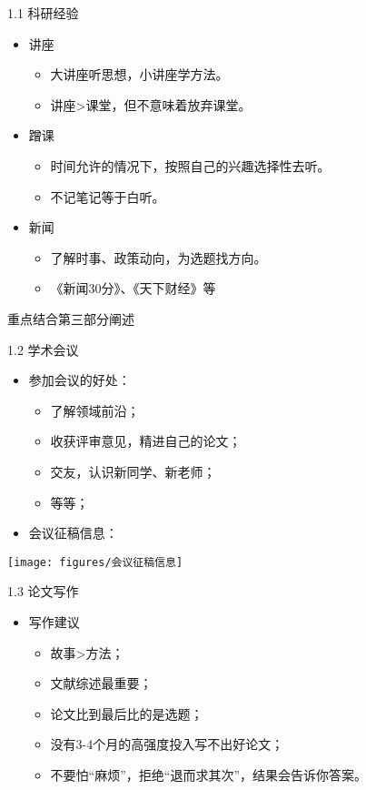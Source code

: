 \documentclass{beamer}%
\begin{document}
\begin{frame}[t]{1.1 科研经验}
\begin{itemize}
  \item 讲座
  \begin{itemize}
    \item 大讲座听思想，小讲座学方法。
    \item 讲座>课堂，但不意味着放弃课堂。
  \end{itemize}
  \item 蹭课
  \begin{itemize}
    \item 时间允许的情况下，按照自己的兴趣选择性去听。
    \item 不记笔记等于白听。
  \end{itemize}
  \item 新闻
  \begin{itemize}
    \item 了解时事、政策动向，为选题找方向。
    \item 《新闻30分》、《天下财经》等
  \end{itemize}
\end{itemize}
重点结合第三部分阐述
\end{frame}

\begin{frame}[t]{1.2 学术会议}
\begin{itemize}
  \item 参加会议的好处：
  \begin{itemize}
    \item 了解领域前沿；
    \item 收获评审意见，精进自己的论文；
    \item 交友，认识新同学、新老师；
    \item 等等；
  \end{itemize}
  \item 会议征稿信息：
\end{itemize}
\vspace{-0.2cm} %
\begin{center}
	\texttt{[image: figures/会议征稿信息]}
\end{center}
\end{frame}

\begin{frame}[t]{1.3 论文写作}
\begin{itemize}
  \item 写作建议
  \begin{itemize}
    \item 故事>方法；
    \item 文献综述最重要；
    \item 论文比到最后比的是选题；
    \item 没有3-4个月的高强度投入写不出好论文；
    \item 不要怕“麻烦”，拒绝“退而求其次”，结果会告诉你答案。
  \end{itemize}
\end{itemize}

\end{frame}
\end{document}
